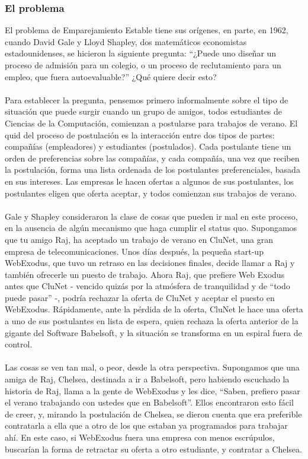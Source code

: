 \documentclass[a4paper]{article}
\begin{document}
\subsubsection*{El problema}
El problema de Emparejamiento Estable tiene sus orígenes, en parte, en 1962, cuando David Gale y Lloyd Shapley, dos matemáticos economistas estadounidenses, se hicieron la siguiente pregunta: “¿Puede uno diseñar un proceso de admisión para un colegio, o un proceso de reclutamiento para un empleo, que fuera autoevaluable?”  ¿Qué quiere decir esto?
\\
\\
	Para establecer la pregunta, pensemos primero informalmente sobre el tipo de situación que puede surgir cuando un grupo de amigos, todos estudiantes de Ciencias de la Computación, comienzan a postularse para trabajos de verano. El quid del proceso de postulación es la interacción entre dos tipos de partes: compañías (empleadores) y estudiantes (postulados). Cada postulante tiene un orden de preferencias sobre las compañías, y cada compañía, una vez que reciben la postulación, forma una lista ordenada de los postulantes preferenciales, basada en sus intereses. Las empresas le hacen ofertas a algunos de sus postulantes, los postulantes eligen que oferta aceptar, y todos comienzan sus trabajos de verano.  
\\
\\
	Gale y Shapley consideraron la clase de cosas que pueden ir mal en este proceso, en la ausencia de algún mecanismo que haga cumplir el status quo. Supongamos que tu amigo Raj, ha aceptado un trabajo de verano en CluNet, una gran empresa de telecomunicaciones. Unos días después, la pequeña start-up WebExodus, que tuvo un retraso en las decisiones finales, decide llamar a Raj y también ofrecerle un puesto de trabajo. Ahora Raj, que prefiere Web Exodus antes que CluNet - vencido quizás por la atmósfera de tranquilidad y de “todo puede pasar” -, podría rechazar la oferta de CluNet y aceptar el puesto en WebExodus.  Rápidamente, ante la pérdida de la oferta, CluNet le hace una oferta a uno de sus postulantes en lista de espera, quien rechaza la oferta anterior de la gigante del Software Babelsoft, y la situación se transforma en un espiral fuera de control.
\\
\\
	Las cosas se ven tan mal, o peor, desde la otra perspectiva. Supongamos que una amiga de Raj, Chelsea, destinada a ir a Babelsoft, pero habiendo escuchado la historia de Raj, llama a la gente de WebExodus y les dice, “Saben, prefiero pasar el verano trabajando con ustedes que en Babelsoft”. Ellos encontraron esto fácil de creer, y, mirando la postulación de Chelsea, se dieron cuenta que era preferible contratarla a ella que a otro de los que estaban ya programados para trabajar ahí. En este caso, si WebExodus fuera una empresa con menos escrúpulos, buscarían la forma de retractar su oferta a otro estudiante, y contratar a Chelsea.
\end{document}
